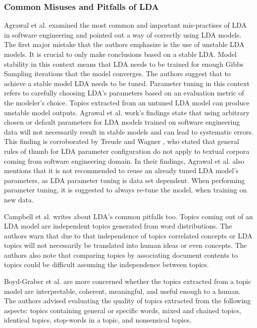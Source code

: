         \subsubsection{Common Misuses and Pitfalls of LDA\label{LDA_pitfalls}}
            Agrawal et al. \cite{agrawal2018wrong} examined the most common and important mis-practises of LDA in software engineering and pointed out a way of correctly using LDA models. The first major mistake that the authors emphasize is the use of unstable LDA models. It is crucial to only make conclusions based on a stable LDA. Model stability in this context means that LDA needs to be trained for enough Gibbs Sampling iterations that the model converges. The authors suggest that to achieve a stable model LDA needs to be tuned. Parameter tuning in this context refers to carefully choosing LDA's parameters based on an evaluation metric of the modeler's choice. Topics extracted from an untuned LDA model can produce unstable model outputs. Agrawal et al. \cite{agrawal2018wrong} work's findings state that using arbitrary chosen or default parameters for LDA models trained on software engineering data will not necessarily result in stable models and can lead to systematic errors. This finding is corroborated by Treude and Wagner \cite{treude2019predicting}, who stated that general rules of thumb for LDA parameter configuration do not apply to textual corpora coming from software engineering domain. In their findings, Agrawal et al. \cite{agrawal2018wrong} also mentions that it is not recommended to reuse an already tuned LDA model's parameters, as LDA parameter tuning is data set dependent. When performing parameter tuning, it is suggested to always re-tune the model, when training on new data.
            
            Campbell et al. \cite{campbell2015latent} writes about LDA's common pitfalls too. Topics coming out of an LDA model are independent topics generated from word distributions. The authors warn that due to that independence of topics correlated concepts or LDA topics will not necessarily be translated into human ideas or even concepts. The authors also note that comparing topics by associating document contents to topics could be difficult assuming the independence between topics.
            
            Boyd-Graber et al. \cite{boyd2014care} are more concerned whether the topics extracted from a topic model are interpretable, coherent, meaningful, and useful enough to a human. The authors advised evaluating the quality of topics extracted from the following aspects: topics containing general or specific words, mixed and chained topics, identical topics, stop-words in a topic, and nonsensical topics.
            
